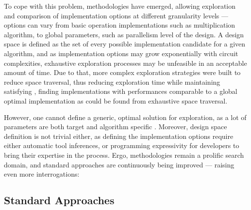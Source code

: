     To cope with this problem,  methodologies have emerged, allowing exploration and comparison of implementation options at different granularity levels --- options can vary from basic operation implementations such as multiplication algorithm, to global parameters, such as parallelism level of the design.
    A design space is defined as the set of every possible implementation candidate for a given algorithm, and as implementation options may grow exponentially with circuit complexities, exhaustive exploration processes may be unfeasible in an acceptable amount of time.
    Due to that, more complex exploration strategies were built to reduce space traversal, thus reducing exploration time while maintaining satisfying , \ie finding implementations with performances comparable to a global optimal implementation as could be found from exhaustive space traversal. 

    However, one cannot define a generic, optimal solution for exploration, as a lot of parameters are both target and algorithm specific \cite{schafer_high-level_2020}.
    Moreover, design space definition is not trivial either, as defining the implementation options require either automatic tool inferences, or programming expressivity for developers to bring their expertise in the process.
    Ergo,  methodologies remain a prolific search domain, and standard approaches are continuously being improved --- raising even more interrogations:


\clearpage
    \subsection{Standard Approaches}
    \label{ch.problem:sec.dse:ssec.approaches}

